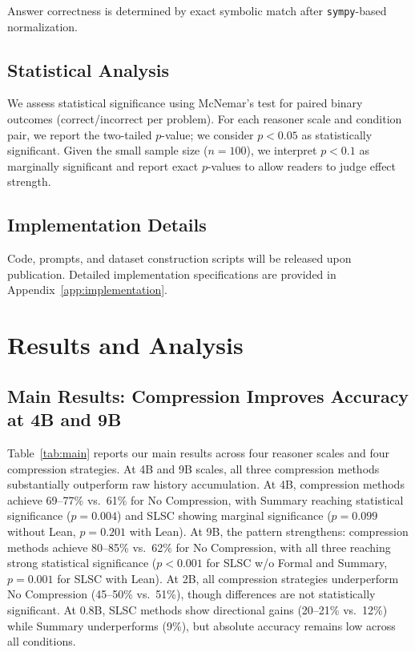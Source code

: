 Answer correctness is determined by exact symbolic match after \texttt{sympy}-based normalization.

\subsection{Statistical Analysis}
\label{sec:stats}

We assess statistical significance using McNemar's test for paired binary outcomes (correct/incorrect per problem). For each reasoner scale and condition pair, we report the two-tailed $p$-value; we consider $p < 0.05$ as statistically significant. Given the small sample size ($n=100$), we interpret $p < 0.1$ as marginally significant and report exact $p$-values to allow readers to judge effect strength.

\subsection{Implementation Details}
\label{sec:impl}

Code, prompts, and dataset construction scripts will be released upon publication. Detailed implementation specifications are provided in Appendix~\ref{app:implementation}.


\section{Results and Analysis}
\label{sec:results}

\subsection{Main Results: Compression Improves Accuracy at 4B and 9B}
\label{sec:main_results}

Table~\ref{tab:main} reports our main results across four reasoner scales and four compression strategies. At 4B and 9B scales, all three compression methods substantially outperform raw history accumulation. At 4B, compression methods achieve 69--77\% vs.\ 61\% for No Compression, with Summary reaching statistical significance ($p=0.004$) and SLSC showing marginal significance ($p=0.099$ without Lean, $p=0.201$ with Lean). At 9B, the pattern strengthens: compression methods achieve 80--85\% vs.\ 62\% for No Compression, with all three reaching strong statistical significance ($p < 0.001$ for SLSC w/o Formal and Summary, $p=0.001$ for SLSC with Lean). At 2B, all compression strategies underperform No Compression (45--50\% vs.\ 51\%), though differences are not statistically significant. At 0.8B, SLSC methods show directional gains (20--21\% vs.\ 12\%) while Summary underperforms (9\%), but absolute accuracy remains low across all conditions.

